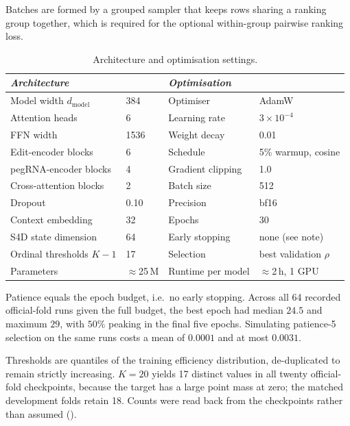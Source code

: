 \documentclass[11pt]{article}
\newcommand{\rhoS}{\rho}
\begin{document}
Batches are formed by a grouped sampler that keeps rows sharing a ranking group
together, which is required for the optional within-group pairwise ranking loss.

\begin{table}[H]
\centering
\begin{threeparttable}
\caption{Architecture and optimisation settings.}
\label{tab:hyper}
\begin{tabular}{l l l l}
\toprule
\multicolumn{2}{l}{\emph{Architecture}} & \multicolumn{2}{l}{\emph{Optimisation}} \\
\midrule
Model width $d_{\mathrm{model}}$ & 384            & Optimiser            & AdamW \\
Attention heads                  & 6              & Learning rate        & $3\times10^{-4}$ \\
FFN width                        & 1536           & Weight decay         & 0.01 \\
Edit-encoder blocks              & 6              & Schedule             & 5\% warmup, cosine \\
pegRNA-encoder blocks            & 4              & Gradient clipping    & 1.0 \\
Cross-attention blocks           & 2              & Batch size           & 512 \\
Dropout                          & 0.10           & Precision            & bf16 \\
Context embedding                & 32             & Epochs               & 30 \\
S4D state dimension              & 64             & Early stopping       & none (see note) \\
Ordinal thresholds $K-1$         & 17            & Selection            & best validation $\rhoS$ \\
Parameters                       & $\approx$25\,M & Runtime per model    & $\approx$2\,h, 1 GPU \\
\bottomrule
\end{tabular}
\begin{tablenotes}[flushleft]\footnotesize
\item Patience equals the epoch budget, i.e.\ no early stopping. Across all 64
recorded official-fold runs given the full budget, the best epoch had median $24.5$ and
maximum $29$, with $50\%$ peaking in the final five epochs. Simulating patience-5
selection on the same runs costs a mean of $0.0001$ and at most $0.0031$.
\item Thresholds are quantiles of the training efficiency distribution, de-duplicated
to remain strictly increasing. $K{=}20$ yields 17 distinct values in all twenty
official-fold checkpoints, because the target has a large point mass at zero; the
matched development folds retain 18. Counts were read back from the checkpoints rather
than assumed ().
\end{tablenotes}
\end{threeparttable}
\end{table}
\end{document}
